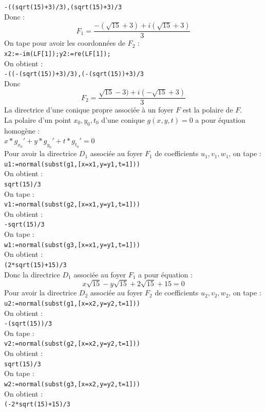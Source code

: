 \documentclass[a4paper,11pt]{book}
\begin{document}
{\tt -((sqrt(15)+3)/3),(sqrt(15)+3)/3}\\
Donc :
$$F_1=\frac{-(\sqrt{15}+3)+i(\sqrt{15}+3)}{3}$$
On tape pour avoir les coordonn\'ees de $F_2$ :\\
{\tt x2:=-im(LF[1]);y2:=re(LF[1]);}\\
On obtient :\\
{\tt -((-(sqrt(15))+3)/3),(-(sqrt(15))+3)/3}\\
Donc $$F_2=\frac{\sqrt{15}-3)+i(-\sqrt{15}+3)}{3}$$
La directrice d'une conique propre associ\'ee \`a un foyer $F$ est la polaire
de $F$.\\
La polaire d'un point $x_0,y_0,t_0$ d'une conique $g(x,y,t)=0$ a pour 
\'equation homog\`ene :\\
$x*g_{x_0}'+y*g_{y_0}'+t*g_{t_0}'=0$\\
Pour avoir la directrice $D_1$ associ\'ee au foyer $F_1$ de coefficients 
$u_1,v_1,w_1$, on tape :\\
{\tt u1:=normal(subst(g1,[x=x1,y=y1,t=1]))}\\
On obtient :\\
{\tt sqrt(15)/3}\\
On tape :\\
{\tt v1:=normal(subst(g2,[x=x1,y=y1,t=1]))}\\
On obtient :\\
{\tt -sqrt(15)/3}\\
On tape :\\
{\tt w1:=normal(subst(g3,[x=x1,y=y1,t=1]))}\\
On obtient :\\
{\tt (2*sqrt(15)+15)/3}\\
Donc la directrice $D_1$ associ\'ee au foyer $F_1$ a pour \'equation :
$$x\sqrt{15}-y\sqrt{15}+2\sqrt{15}+15=0$$
Pour avoir la directrice $D_2$ associ\'ee au foyer $F_2$ de coefficients 
$u_2,v_2,w_2$, on tape :\\
{\tt u2:=normal(subst(g1,[x=x2,y=y2,t=1]))}\\
On obtient :\\
{\tt -(sqrt(15))/3}\\
On tape :\\
{\tt v2:=normal(subst(g2,[x=x2,y=y2,t=1]))}\\
On obtient :\\
{\tt sqrt(15)/3}\\
On tape :\\
{\tt w2:=normal(subst(g3,[x=x2,y=y2,t=1]))}\\
On obtient :\\
{\tt (-2*sqrt(15)+15)/3}\\
\end{document}
